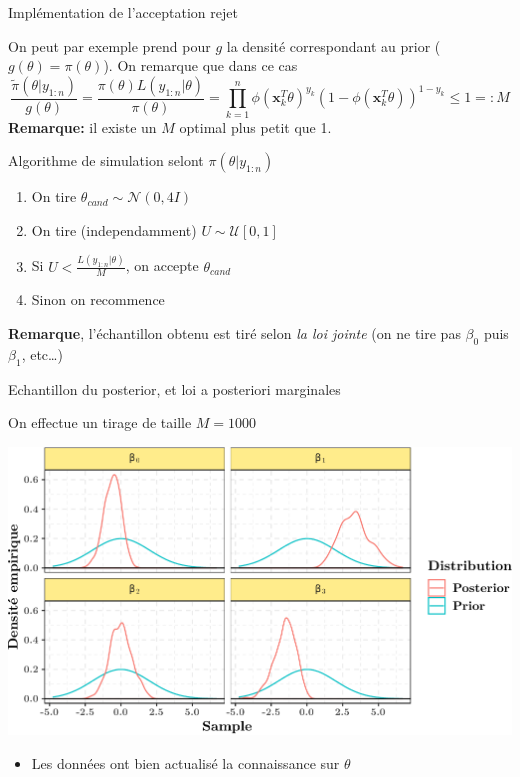 \documentclass[9pt,ignorenonframetext,]{beamer}
\providecommand{\tightlist}{%
  \setlength{\itemsep}{0pt}\setlength{\parskip}{0pt}}
\begin{document}
\begin{frame}{Implémentation de l'acceptation rejet}
\protect\hypertarget{impluxe9mentation-de-lacceptation-rejet}{}

On peut par exemple prend pour \(g\) la densité correspondant au prior
(\(g(\theta) = \pi(\theta)\)). On remarque que dans ce cas
\[\frac{\tilde{\pi}(\theta \vert y_{1:n})}{g(\theta)} = \frac{\pi(\theta)L(y_{1:n}\vert \theta)}{\pi(\theta)} = \prod_{k = 1}^n \phi(\mathbf{x}_k^T\theta)^{y_k} (1 - \phi(\mathbf{x}_k^T\theta))^{1 - y_k} \leq 1 =:M\]
\textbf{Remarque:} il existe un \(M\) optimal plus petit que 1. \pause

\begin{block}{Algorithme de simulation selont
\(\pi(\theta\vert y_{1:n})\)}

\begin{enumerate}
\tightlist
\item
  On tire \(\theta_{cand} \sim \mathcal{N}(0, 4I)\)
\item
  On tire (independamment) \(U\sim \mathcal{U}[0, 1]\)
\item
  Si \(U < \frac{L(y_{1:n}\vert \theta)}{M}\), on accepte
  \(\theta_{cand}\)
\item
  Sinon on recommence
\end{enumerate}

\pause

\textbf{Remarque}, l'échantillon obtenu est tiré selon \emph{la loi
jointe} (on ne tire pas \(\beta_0\) puis \(\beta_1\), etc\ldots{})

\end{block}

\end{frame}

\begin{frame}{Echantillon du posterior, et loi a posteriori marginales}
\protect\hypertarget{echantillon-du-posterior-et-loi-a-posteriori-marginales}{}

On effectue un tirage de taille \(M = 1000\)

\includegraphics{diapos_inference_bayesienne_files/figure-beamer/plot_posterior_samples-1.pdf}

\begin{itemize}
\tightlist
\item
  Les données ont bien actualisé la connaissance sur \(\theta\)
\end{itemize}

\end{frame}
\end{document}
